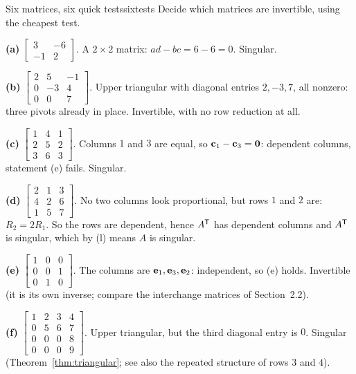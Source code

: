 \documentclass[11pt]{article}
\begin{document}
\begin{exmp}{Six matrices, six quick tests}{sixtests}
Decide which matrices are invertible, using the cheapest test.

\textbf{(a)} $\begin{bmatrix}3&-6\\-1&2\end{bmatrix}$. A $2\times2$ matrix: $ad-bc=6-6=0$. Singular.

\textbf{(b)} $\begin{bmatrix}2&5&-1\\0&-3&4\\0&0&7\end{bmatrix}$. Upper triangular with diagonal entries $2,-3,7$, all nonzero: three pivots already in place. Invertible, with no row reduction at all.

\textbf{(c)} $\begin{bmatrix}1&4&1\\2&5&2\\3&6&3\end{bmatrix}$. Columns $1$ and $3$ are equal, so $\mathbf{c}_1-\mathbf{c}_3=\mathbf{0}$: dependent columns, statement (e) fails. Singular.

\textbf{(d)} $\begin{bmatrix}2&1&3\\4&2&6\\1&5&7\end{bmatrix}$. No two columns look proportional, but rows $1$ and $2$ are: $R_2=2R_1$. So the rows are dependent, hence $A^{\mathsf T}$ has dependent columns and $A^{\mathsf T}$ is singular, which by (l) means $A$ is singular.

\textbf{(e)} $\begin{bmatrix}1&0&0\\0&0&1\\0&1&0\end{bmatrix}$. The columns are $\mathbf{e}_1,\mathbf{e}_3,\mathbf{e}_2$: independent, so (e) holds. Invertible (it is its own inverse; compare the interchange matrices of Section~2.2).

\textbf{(f)} $\begin{bmatrix}1&2&3&4\\0&5&6&7\\0&0&0&8\\0&0&0&9\end{bmatrix}$. Upper triangular, but the third diagonal entry is $0$. Singular (Theorem~\ref{thm:triangular}; see also the repeated structure of rows $3$ and $4$).
\end{exmp}
\end{document}
